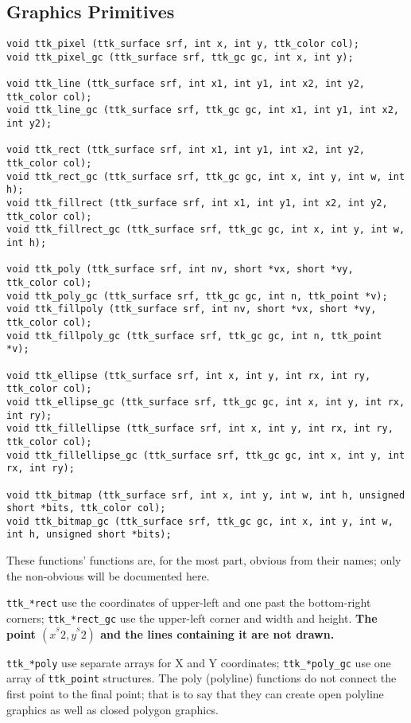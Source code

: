 \documentclass[12pt,letterpaper]{report}
\begin{document}
\subsection{Graphics Primitives}
{\footnotesize
\begin{verbatim}
void ttk_pixel (ttk_surface srf, int x, int y, ttk_color col);
void ttk_pixel_gc (ttk_surface srf, ttk_gc gc, int x, int y);

void ttk_line (ttk_surface srf, int x1, int y1, int x2, int y2, ttk_color col);
void ttk_line_gc (ttk_surface srf, ttk_gc gc, int x1, int y1, int x2, int y2);

void ttk_rect (ttk_surface srf, int x1, int y1, int x2, int y2, ttk_color col);
void ttk_rect_gc (ttk_surface srf, ttk_gc gc, int x, int y, int w, int h);
void ttk_fillrect (ttk_surface srf, int x1, int y1, int x2, int y2, ttk_color col);
void ttk_fillrect_gc (ttk_surface srf, ttk_gc gc, int x, int y, int w, int h);

void ttk_poly (ttk_surface srf, int nv, short *vx, short *vy, ttk_color col);
void ttk_poly_gc (ttk_surface srf, ttk_gc gc, int n, ttk_point *v);
void ttk_fillpoly (ttk_surface srf, int nv, short *vx, short *vy, ttk_color col);
void ttk_fillpoly_gc (ttk_surface srf, ttk_gc gc, int n, ttk_point *v);

void ttk_ellipse (ttk_surface srf, int x, int y, int rx, int ry, ttk_color col);
void ttk_ellipse_gc (ttk_surface srf, ttk_gc gc, int x, int y, int rx, int ry);
void ttk_fillellipse (ttk_surface srf, int x, int y, int rx, int ry, ttk_color col);
void ttk_fillellipse_gc (ttk_surface srf, ttk_gc gc, int x, int y, int rx, int ry);

void ttk_bitmap (ttk_surface srf, int x, int y, int w, int h, unsigned short *bits, ttk_color col);
void ttk_bitmap_gc (ttk_surface srf, ttk_gc gc, int x, int y, int w, int h, unsigned short *bits);
\end{verbatim}
}

These functions' functions are, for the most part,
obvious from their names; only the non-obvious will be documented here.

\verb|ttk_*rect| use the coordinates of upper-left and one past the bottom-right corners; \verb|ttk_*rect_gc| use
the upper-left corner and width and height. {\bf The point $(x^^S2, y^^S2)$ and the lines containing it are not drawn.}

\verb|ttk_*poly| use separate arrays for X and Y coordinates;
\verb|ttk_*poly_gc| use one array of \verb|ttk_point| structures.
The poly (polyline) functions do not connect the first point to the
final point; that is to say that they can create open polyline
graphics as well as closed polygon graphics.
\end{document}
